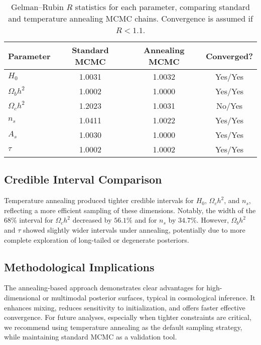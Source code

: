 \documentclass[11pt]{article}
\theoremstyle{definition}
\begin{document}
\renewcommand{\arraystretch}{1.2} %
\begin{table}[h]
\centering

\label{tab:rhat_comparison}
\begin{tabular}{lccc}
\toprule
\textbf{Parameter} & \textbf{Standard MCMC} & \textbf{Annealing MCMC} & \textbf{Converged?} \\
\midrule
$H_0$            & 1.0031 & 1.0032 & Yes/Yes \\
$\Omega_b h^2$   & 1.0002 & 1.0000 & Yes/Yes \\
$\Omega_c h^2$   & 1.2023 & 1.0031 & No/Yes \\
$n_s$            & 1.0411 & 1.0022 & Yes/Yes \\
$A_s$            & 1.0030 & 1.0000 & Yes/Yes \\
$\tau$           & 1.0002 & 1.0002 & Yes/Yes \\
\bottomrule
\end{tabular}
\caption{Gelman–Rubin $R\hat{}$ statistics for each parameter, comparing standard and temperature annealing MCMC chains. Convergence is assumed if $R\hat{} < 1.1$.}
\end{table}





\subsection{Credible Interval Comparison}

Temperature annealing produced tighter credible intervals for $H_0$, $\Omega_c h^2$, and $n_s$, reflecting a more efficient sampling of these dimensions. Notably, the width of the $68\%$ interval for $\Omega_c h^2$ decreased by $56.1\%$ and for $n_s$ by $34.7\%$. However, $\Omega_b h^2$ and $\tau$ showed slightly wider intervals under annealing, potentially due to more complete exploration of long-tailed or degenerate posteriors.

\subsection{Methodological Implications}

The annealing-based approach demonstrates clear advantages for high-dimensional or multimodal posterior surfaces, typical in cosmological inference. It enhances mixing, reduces sensitivity to initialization, and offers faster effective convergence. For future analyses, especially when tighter constraints are critical, we recommend using temperature annealing as the default sampling strategy, while maintaining standard MCMC as a validation tool.
\end{document}
